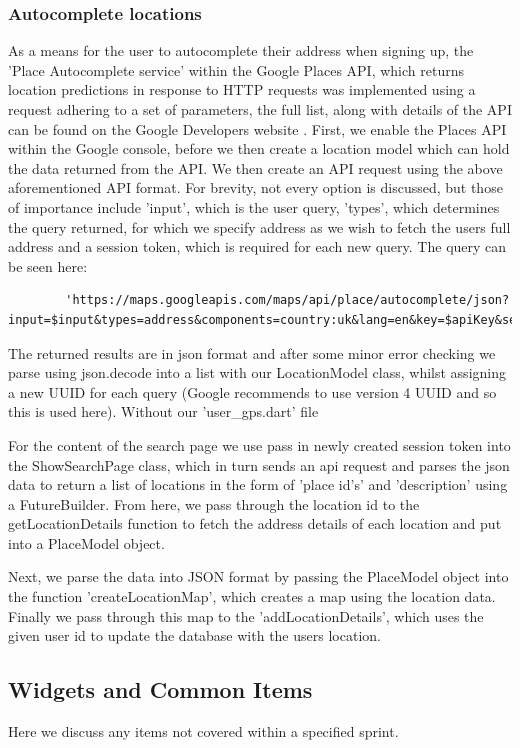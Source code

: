 \documentclass[12pt]{article}
\begin{document}
	\subsubsection{Autocomplete locations}
	As a means for the user to autocomplete their address when signing up, the 'Place Autocomplete service' within the Google Places API, which returns location predictions in response to HTTP requests was implemented using a request adhering to a set of parameters, the full list, along with details of the API can be found on the Google Developers website \cite{requests}.
	First, we enable the Places API within the Google console, before we then create a location model which can hold the data returned from the API. We then create an API request using the above aforementioned API format. For brevity, not every option is discussed, but those of importance include 'input', which is the user query, 'types', which determines the query returned, for which we specify address as we wish to fetch the users full address and a session token, which is required for each new query. The query can be seen here:
	\begin{lstlisting}
		'https://maps.googleapis.com/maps/api/place/autocomplete/json?input=$input&types=address&components=country:uk&lang=en&key=$apiKey&sessiontoken=$sessionToken'
	\end{lstlisting}
	The returned results are in json format and after some minor error checking we parse using json.decode into a list with our LocationModel class, whilst assigning a new UUID for each query (Google recommends to use version 4 UUID and so this is used here). Without our 'user\_gps.dart' file
	
	For the content of the search page we use pass in newly created session token into the ShowSearchPage class, which in turn sends an api request and parses the json data to return a list of locations in the form of 'place id's' and 'description' using a FutureBuilder. From here, we pass through the location id to the getLocationDetails function to fetch the address details of each location and put into a PlaceModel object.
	
	Next, we parse the data into JSON format by passing the PlaceModel object into the function 'createLocationMap', which creates a map using the location data. Finally we pass through this map to the 'addLocationDetails', which uses the given user id to update the database with the users location.
	
	\subsection{Widgets and Common Items}
	Here we discuss any items not covered within a specified sprint.
	
\end{document}
